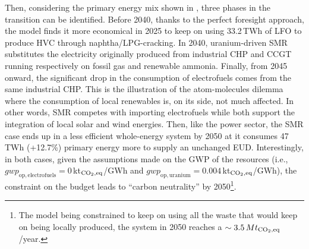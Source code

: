 \documentclass[11pt,twoside,a4paper,english]{article}
\def\ie{i.e.,}
\begin{document}
\newpage
Then, considering the primary energy mix shown in , three phases in the transition can be identified. Before 2040, thanks to the perfect foresight approach, the model finds it more economical in 2025 to keep on using 33.2\,TWh of \gls{LFO} to produce \gls{HVC} through naphtha/LPG-cracking. In 2040, uranium-driven \gls{SMR} substitutes the electricity originally produced from industrial \gls{CHP} and \gls{CCGT} running respectively on fossil gas and renewable ammonia. Finally, from 2045 onward, the significant drop in the consumption of electrofuels comes from the same industrial \gls{CHP}. This is the illustration of the atom-molecules dilemma where the consumption of local renewables is, on its side, not much affected. In other words, \gls{SMR} competes with importing electrofuels while both support the integration of local solar and wind energies. Then, like the power sector, the SMR case ends up in a less efficient whole-energy system by 2050 at it consumes 47\,TWh (+12.7\%) primary energy more to supply an unchanged \gls{EUD}. Interestingly, in both cases, given the assumptions made on the \gls{GWP} of the resources (\ie $\mathit{gwp}_{\mathrm{op,electrofuels}}=0$\,kt$_{\ce{CO2},\text{eq}}$/GWh and $\mathit{gwp}_{\mathrm{op,uranium}}=0.004$\,kt$_{\ce{CO2},\text{eq}}$/GWh), the constraint on the  budget leads to ``carbon neutrality'' by 2050\footnote{The model being constrained to keep on using all the waste that would keep on being locally produced, the system in 2050 reaches a $\sim 3.5\,Mt_{\ce{CO2},\text{eq}}$/year.}.
\end{document}
